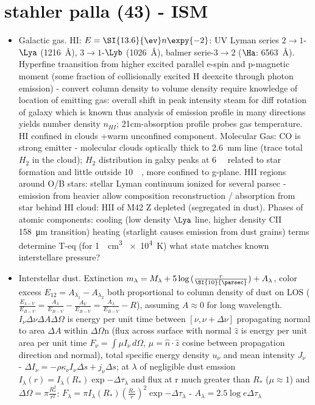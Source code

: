 \chapter{stahler palla (43) - ISM }

\begin{itemize}
\item Galactic gas. HI: $E=\SI{13.6}{\ev}n\expy{-2}$: UV Lyman series $2\to1$-$\Lya$ (\SI{1216}{\angstrom}), $3\to1$-$\Lyb$ (\SI{1026}{\angstrom}), balmer serie-$3\to2$ ($\Ha$: \SI{6563}{\angstrom}). Hyperfine traansition from higher excited parallel e-spin and p-magnetic moment (some fraction of collisionally excited H deexcite through photon emission) - convert column density to volume density require knowledge of location of emitting gas: overall shift in peak intensity steam for diff rotation of galaxy which is known thus analysis of emission profile in many directions yields number density $n_{HI}$; 21cm-absorption profile probes gas temperature. HI confined in clouds +warm unconfined component.
Molecular Gas: CO is strong emitter - molecular clouds optically thick to \SI{2.6}{\milli\meter} line (trace total $H_2$ in the cloud); $H_2$ distribution in galxy peaks at \SI{6}{\kilo\parsec} related to star formation and little outside \SI{10}{\kilo\parsec}, more confined to g-plane.
HII regions around O/B stars: stellar Lyman continuum ionized for several parsec - emission from heavier allow composition reconstruction / absorption from star behind HI cloud: HII of M42 Z depleted (segregated in dust).
Phases of atomic components: cooling (low density $\Lya$ line, higher density CII \SI{158}{\micro\meter} transition) heating (starlight causes \Pelectron emission from dust grains) terms determine T-eq (for \SI{1}{\per\cubic\cm} \SI{e4}{\kelvin}) what state matches known interstellare pressure?
\item Interstellar dust. Extinction $m_{\lambda}=M_{\lambda}+5\log{(\frac{r}{\SI{10}{\parsec}})}+A_{\lambda}$, color excess $E_{12}=A_{\lambda_1}-A_{\lambda_2}$ both proportional to column density of dust on LOS ($\frac{E_{\lambda-V}}{E_{B-V}}=\frac{A_{\lambda}}{E_{B-V}}-\frac{A_V}{E_{B-V}}=\frac{A_{\lambda}}{E_{B-V}}-R$), assuming $A\approx0$ for long wavelength.
$I_{\nu}\Delta\nu\Delta A\Delta\Omega$ is energy per unit time between $[\nu,\nu+\Delta\nu]$ propagating normal to area $\Delta A$ within $\Delta\Omega$n (flux across surface with normal $\hat{z}$ is energy per unit area per unit time $F_{\nu}=\int\mu I_{\nu}\,d\Omega$, $\mu=\hat{n}\cdot\hat{z}$ cosine between propagation direction and normal), total specific energy density $u_{\nu}$ and mean intensity $J_{\nu}$ - $\Delta I_{\nu}=-\rho\kappa_{\nu}I_{\nu}\Delta s+j_{\nu}\Delta s$; at $\lambda$ of negligible dust emssion $I_{\lambda}(r)=I_{\lambda}(R_*)\exp{-\Delta\tau_{\lambda}}$ and flux at r much greater than $R_*$ ($\mu\approx1$) and $\Delta\Omega=\pi\frac{R_*^2}{r^2}$: $F_{\lambda}=\pi I_{\lambda}(R_*)(\frac{R_*}{r})^2\exp{-\Delta\tau_{\lambda}}$ - $A_{\lambda}=2.5\log{e}\Delta\tau_{\lambda}$
\end{itemize}

